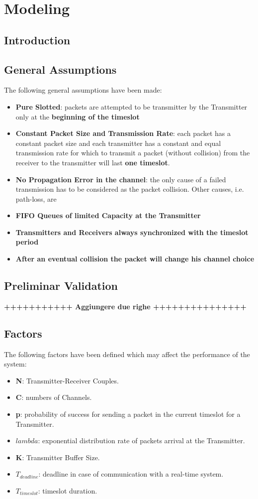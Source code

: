 \section{Modeling}
\subsection{Introduction}

\subsection{General Assumptions}
The following general assumptions have been made:
\begin{itemize}
	\item \textbf{Pure Slotted}: packets are attempted to be transmitter by the Transmitter only at the \textbf{beginning of the timeslot}
	\item \textbf{Constant Packet Size and Transmission Rate}: each packet has a constant packet size and each transmitter has a constant and equal transmission rate for which to transmit a packet (without collision) from the receiver to the transmitter will last \textbf{one timeslot}.
	\item \textbf{No Propagation Error in the channel}: the only cause of a failed transmission has to be considered as the packet collision. Other causes, i.e. path-loss, are 
	\item \textbf{FIFO Queues of limited Capacity at the Transmitter} 
	\item \textbf{Transmitters and Receivers always synchronized with the timeslot period}
	\item \textbf{After an eventual collision the packet will change his channel choice}
\end{itemize}

\subsection{Preliminar Validation}
\textbf{+++++++++++ Aggiungere due righe +++++++++++++++}
\subsection{Factors}
The following factors have been defined which may affect the performance of the system:
\begin{itemize}
	\item \textbf{N}: Transmitter-Receiver Couples.
	\item \textbf{C}: numbers of Channels.
	\item \textbf{p}: probability of success for sending a packet in the current timeslot for a Transmitter.
	\item \textbf{$lambda$}: exponential distribution rate of packets arrival at the Transmitter.
	\item \textbf{K}: Transmitter Buffer Size.
	\item $T_{deadline}$: deadline in case of communication with a real-time system.
	\item $T_{timeslot}$: timeslot duration. 
\end{itemize}
